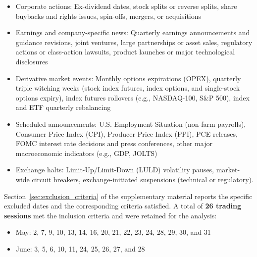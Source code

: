 \documentclass{rQUF2e}
\theoremstyle{plain}
\theoremstyle{definition}
\theoremstyle{remark}
\begin{document}
\begin{itemize}
    \item Corporate actions: Ex-dividend dates, stock splits or reverse splits, share buybacks and rights issues, spin-offs, mergers, or acquisitions
    \item Earnings and company-specific news: Quarterly earnings announcements and guidance revisions, joint ventures, large partnerships or asset sales, regulatory actions or class-action lawsuits, product launches or major technological disclosures
    \item Derivative market events: Monthly options expirations (OPEX), quarterly triple witching weeks (stock index futures, index options, and single-stock options expiry), index futures rollovers (e.g., NASDAQ-100, S\&P 500), index and ETF quarterly rebalancing
    \item Scheduled announcements: U.S. Employment Situation (non-farm payrolls), Consumer Price Index (CPI), Producer Price Index (PPI), PCE releases, FOMC interest rate decisions and press conferences, other major macroeconomic indicators (e.g., GDP, JOLTS)
    \item Exchange halts: Limit-Up/Limit-Down (LULD) volatility pauses, market-wide circuit breakers, exchange-initiated suspensions (technical or regulatory).
\end{itemize}

Section~\ref{sec:exclusion_criteria} of the supplementary material reports the specific excluded dates and the corresponding criteria satisfied. A total of \textbf{26 trading sessions} met the inclusion criteria and were retained for the analysis:

\begin{itemize}
    \item May: 2, 7, 9, 10, 13, 14, 16, 20, 21, 22, 23, 24, 28, 29, 30, and 31
    \item June: 3, 5, 6, 10, 11, 24, 25, 26, 27, and 28
\end{itemize}



\end{document}
